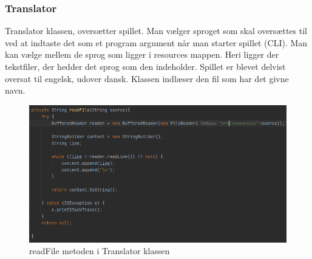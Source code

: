 \subsubsection{Translator}
Translator klassen, oversætter spillet. Man vælger sproget som skal oversættes til ved at indtaste det som et program argument når man starter spillet (CLI). Man kan vælge mellem de sprog som ligger i resources mappen. Heri ligger der tekstfiler, der hedder det sprog som den indeholder. Spillet er blevet delvist oversat til engelsk, udover dansk. Klassen indlæser den fil som har det givne navn. 

\begin{figure}[H]
    \centering
    \includegraphics[width=\textwidth]{sources/7_implementering/readFileTranslator.PNG}
    \caption{readFile metoden i Translator klassen}
    \label{fig:readFile}
\end{figure}